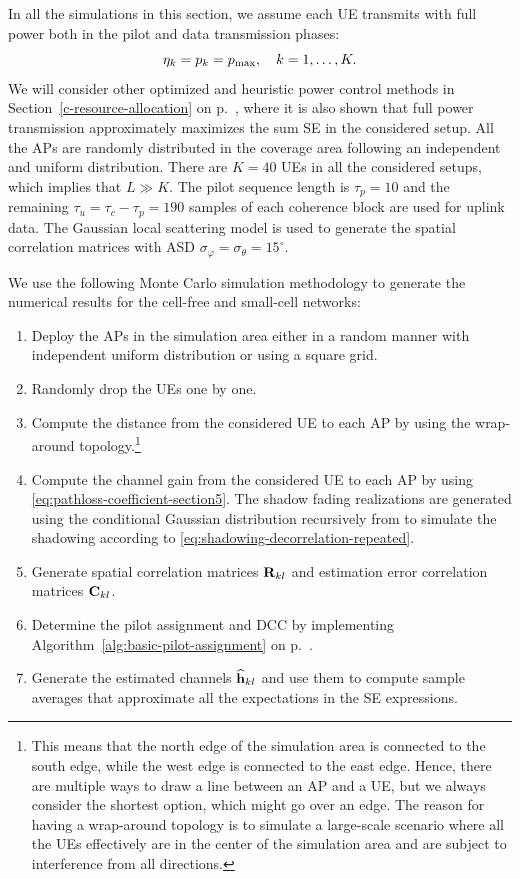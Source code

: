 In all the simulations in this section, we assume each UE transmits with full power both in the pilot and data transmission phases:
\begin{equation}
\eta_k=p_k=p_{\textrm{max}}, \quad k= 1,\ldots,K. 
\end{equation}
We will consider other optimized and heuristic power control methods in Section~\ref{c-resource-allocation} on p.~\pageref{c-resource-allocation}, where it is also shown that full power transmission approximately maximizes the sum SE in the considered setup. All the APs are randomly distributed in the coverage area following an independent and uniform distribution. There are $K=40$ UEs in all the considered setups, which implies that $L \gg K$. The pilot sequence length is $\tau_p=10$ and the remaining $\tau_u=\tau_c-\tau_p=190$ samples of each coherence block are used for uplink data. The Gaussian local scattering model is used to generate the spatial correlation matrices with ASD $\sigma_{\varphi}=\sigma_{\theta}=15^{\circ}$. 

We use the following Monte Carlo simulation methodology to generate the numerical results for the cell-free and small-cell networks:
\begin{enumerate}
	\item Deploy the APs in the simulation area either in a random manner with independent uniform distribution or using a square grid. 
	\item Randomly drop the UEs one by one.
	\item Compute the distance from the considered UE to each AP by using the wrap-around topology.\footnote{This means that the north edge of the simulation area is connected to the south edge, while the west edge is connected to the east edge. Hence, there are multiple ways to draw a line between an AP and a UE, but we always consider the shortest option, which might go over an edge. The reason for having a wrap-around topology is to simulate a large-scale scenario where all the UEs effectively are in the center of the simulation area and are subject to interference from all directions.}
	\item Compute the channel gain from the considered UE to each AP by using \eqref{eq:pathloss-coefficient-section5}. The shadow fading realizations are generated using the conditional Gaussian distribution recursively from \cite[Theorem~10.2]{Kay1993a} to simulate the shadowing according to \eqref{eq:shadowing-decorrelation-repeated}.
	\item Generate spatial correlation matrices $\mathbf{R}_{kl}$ and estimation error correlation matrices $\mathbf{C}_{kl}$.
	\item Determine the pilot assignment and DCC by implementing Algorithm~\ref{alg:basic-pilot-assignment} on p.~\pageref{alg:basic-pilot-assignment}.
	\item Generate the estimated channels $\widehat{\mathbf{h}}_{kl}$ and use them to compute sample averages that approximate all the expectations in the SE expressions.
\end{enumerate}   

